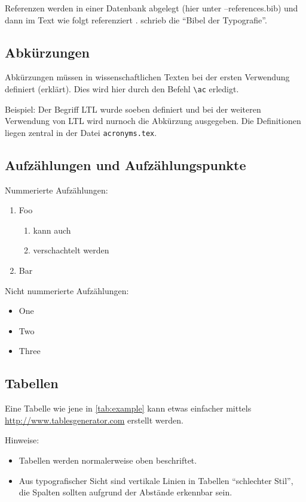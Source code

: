 Referenzen werden in einer Datenbank abgelegt (hier unter {--references.bib}) und dann im Text wie folgt referenziert \cite{Bringhurst1993}. \textcite{Bringhurst1993} schrieb die "`Bibel der Typografie"'. 

\subsection{Abkürzungen}

Abkürzungen müssen in wissenschaftlichen Texten bei der ersten Verwendung definiert (erklärt). Dies wird hier durch den Befehl \verb+\ac+ erledigt. 

Beispiel: Der Begriff \ac{LTL} wurde soeben definiert und bei der weiteren Verwendung von \ac{LTL} wird nurnoch die Abkürzung ausgegeben. Die Definitionen liegen zentral in der Datei \verb+acronyms.tex+. 

\subsection{Aufzählungen und Aufzählungspunkte}
Nummerierte Aufzählungen:
\begin{enumerate}
	\item Foo
    	\begin{enumerate}
        	\item kann auch 
        	\item verschachtelt werden
        \end{enumerate}
	\item Bar
\end{enumerate}

Nicht nummerierte Aufzählungen:
\begin{itemize}
	\item One
	\item Two
	\item Three
\end{itemize}

\subsection{Tabellen}
Eine Tabelle wie jene in \autoref{tab:example} 
kann etwas einfacher mittels \url{http://www.tablesgenerator.com} erstellt werden. 

Hinweise:
\begin{itemize}
    \item Tabellen werden normalerweise oben beschriftet. 
    \item Aus typografischer Sicht sind vertikale Linien in Tabellen "`schlechter Stil"', die Spalten sollten aufgrund der Abstände erkennbar sein. 
\end{itemize}

